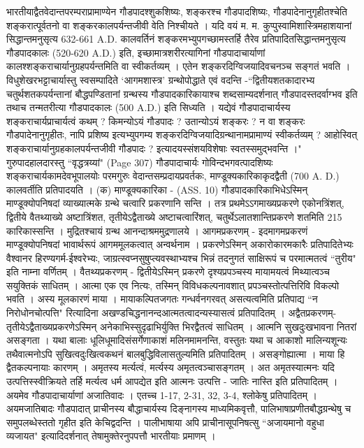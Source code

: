 भारतीयाद्वैतवेदान्तपरम्पराप्रामाण्येन गौडपादश्शुकशिष्यः, शङ्करश्च गौडपादशिष्यः, गौडपादेनानुगृहीतश्चेति शङ्करात्पूर्वतनो वा शङ्करकालपर्यन्तजीवी वेति निश्चीयते । यदि वयं म. म. कुप्पुस्वामिशास्त्रिमहाशयानां सिद्धान्तमनुसृत्य 632-661 A.D. कालवर्तिनं शङ्करमभ्युपगच्छामस्तर्हि तैरेव प्रतिपादितसिद्धान्तमनुसृत्य गौडपादकालः (520-620 A.D.) इति, इच्छामात्रशरीरत्यागिनां गौडपादाचार्याणां कालश्शङ्कराचार्यानुग्रहपर्यन्तमिति वा स्वीकर्तव्यम् । एतेन शङ्करदिग्विजयादिवचनञ्च सङ्गतं भवति । विधुशेखरभट्टाचार्यास्तु स्वसम्पादिते `आगमशास्त्र' ग्रन्थोपोद्धाते एवं वदन्ति -``द्वितीयशतकादारभ्य चतुर्थशतकपर्यन्तानां बौद्धपण्डितानां ग्रन्थस्य गौडपादकारिकायाश्च शब्दसाम्यदर्शनात् गौडपादस्तदर्वाग्भव इति तथाच तन्मतरीत्या गौडपादकालः (500 A.D.) इति सिध्यति । यद्येवं गौडपादाचार्यस्य शङ्कराचार्यप्राचार्यत्वं कथम् ? किमन्योऽयं गौडपादः ? उतान्योऽयं शङ्करः ? न वा शङ्करः गौडपादेनानुगृहीतः, नापि प्रशिष्य इत्यभ्युपगम्य शङ्करदिग्विजयादिग्रन्थानामप्रामाण्यं स्वीकर्तव्यम् ? आहोस्वित् शङ्कराचार्यानुग्रहकालपर्यन्तजीवी गौडपादः ? इत्यादयस्संशयविशेषाः स्वतस्समुद्भवन्ति ।"
गुरुपादहालदारस्तु ``वृद्धत्रय्यां" (Page 307) गौडपादाचार्यः गोविन्दभगवत्पादशिष्यः शङ्कराचार्यकामदेवभूपालयोः परमगुरुः वेदान्तसम्प्रदायप्रवर्तकः, माण्डूक्यकारिकाकृदद्वैती (700 A. D.) कालवर्तीति प्रतिपादयति ।
(क) माण्डूक्यकारिका - (ASS. 10) गौडपादकारिकाभिधेऽस्मिन् माण्डूक्योपनिषदां व्याख्यात्मके ग्रन्थे चत्वारि प्रकरणानि सन्ति । तत्र प्रथमेऽऽगमाख्यप्रकरणे एकोनत्रिंशत्, द्वितीये वैतथ्याख्ये अष्टात्रिंशत, तृतीयेऽद्वैताख्ये अष्टाचत्वारिंशत्, चतुर्थेऽलातशान्तिप्रकरणे शतमिति 215 कारिकास्सन्ति । मुद्रितश्चायं ग्रन्थ आनन्दाश्रममुद्रणालये ।
आगमप्रकरणम् - इदमागमप्रकरणं माण्डूक्योपनिषदां भावार्थरूपं आगममूलकत्वात् अन्वर्थनाम । प्रकरणेऽस्मिन् अकारोकारमकारैः प्रतिपादितेभ्यः वैश्वानर हिरण्यगर्म-ईश्वरेभ्यः, जाग्रत्स्वप्नसुषुप्त्यवस्थाभ्यश्च भिन्नं तदनुगतं साक्षिरूपं च परमात्मतत्वं ``तुरीय" इति नाम्ना वर्णितम् ।
वैतथ्यप्रकरणम् - द्वितीयेऽस्मिन् प्रकरणे दृश्यप्रपञ्चस्य मायामयत्वं मिथ्यात्वञ्च सयुक्तिकं साधितम् । आत्मा एक एव नित्यः, तस्मिन् विविधकल्पनावशात् प्रपञ्चस्तोत्पत्तिरिवि विकल्पो भवति । अस्य मूलकारणं माया । मायाकल्पितजगतः गन्धर्वनगरवत् असत्यत्वमिति प्रतिपाद्य ``न निरोधोनचोत्पत्ति" रित्यादिना अखण्डचिद्धनानन्दआत्मतत्वादन्यस्यासत्वं प्रतिपादितम् ।
अद्वैतप्रकरणम्-तृतीयेऽद्वैताख्यप्रकरणेऽस्मिन् अनेकाभिस्सुदृढाभिर्युक्ति भिरद्वैतत्वं साधितम् । आत्मनि सुखदुःखभावना नितरां असङ्गता । यथा बालाः धूलिधूमादिसंसर्गेणाकाशं मलिनमामनन्ति, वस्तुतः यथा च आकाशो मालिन्यशून्यः तथैवात्मनोऽपि सुखित्वदुःखित्वकथनं बालबुद्धिविलासतुल्यमिति प्रतिपादितम् । असङ्गोह्यात्मा । माया हि द्वैतकल्पनायाः कारणम् । अमृतस्य मर्त्यत्वं, मर्त्यस्य अमृतत्वञ्चासङ्गतम् । अत अमृतस्यात्मनः यदि उत्पत्तिस्स्वीक्रियते तर्हि मर्त्यत्व धर्म आपद्येत इति आत्मनः उत्पत्ति - जातिः नास्ति इति प्रतिपादितम् । अयमेव गौडपादाचार्याणां अजातिवादः । एतच्च 1-17, 2-31, 32, 3-4, श्लोकेषु प्रतिपादितम् । अयमजातिबादः गौडपादात् प्राचीनस्य बौद्धाचार्यस्य दिङ्नागस्य माध्यमिकवृत्तौ, पालिभाषाप्रणीतबौद्धग्रन्थेषु च समुपलब्धेस्ततो गृहीत इति केचिद्वदन्ति । पालीभाषाया अपि प्राचीनासूपनिषत्सु ``अजायमानो वहुधा व्यजायत" इत्यादिदर्शनात् तेषामुक्तेरनुपपत्तौ भारतीयाः प्रमाणम् ।
